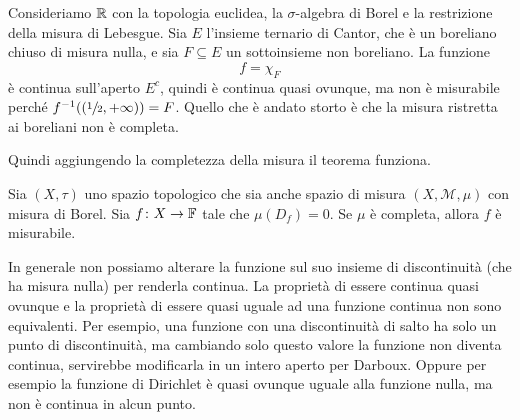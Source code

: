 \documentclass[a4paper]{article}
\begin{document}
\begin{radioactive}
\begin{snippetexample}{}
    Consideriamo \(\mathbb{R}\) con la topologia euclidea,
    la \(\sigma\)-algebra di Borel e la restrizione della misura di Lebesgue.
    Sia \(E\) l'insieme ternario di Cantor, che è un boreliano chiuso di misura
    nulla, e sia \(F \subseteq E\) un sottoinsieme non boreliano. La funzione
    \[
        f=\chi_F
    \]
    è continua sull'aperto \(E^c\), quindi è continua quasi ovunque, ma non è
    misurabile perché \(f^{-1}((\sfrac12,+\infty))=F\).
    Quello che è andato storto è che la misura ristretta ai boreliani non è completa.
\end{snippetexample}
\end{radioactive}

\begin{radioactive}
Quindi aggiungendo la completezza della misura il teorema funziona.
\end{radioactive}

\begin{radioactive}
\begin{snippettheorem}{}
    Sia \((X, \tau)\) uno spazio topologico che sia anche spazio di misura
    \((X, \mathcal M, \mu)\) con misura di Borel.
    Sia \(f \colon X \to \mathbb F\) tale che
    \(\mu(D_f) = 0\). Se \(\mu\) è completa, allora \(f\)
    è misurabile.
\end{snippettheorem}
\end{radioactive}

\begin{radioactive}
In generale non possiamo alterare la funzione sul suo insieme di discontinuità
(che ha misura nulla) per renderla continua.
La proprietà di essere continua quasi ovunque e la proprietà di essere quasi uguale
ad una funzione continua non sono equivalenti.
Per esempio, una funzione con una discontinuità di salto ha solo un punto
di discontinuità, ma cambiando solo questo valore la funzione non diventa continua,
servirebbe modificarla in un intero aperto per Darboux.
Oppure per esempio la funzione di Dirichlet è quasi ovunque uguale alla funzione nulla, ma non è continua in alcun punto.
\end{radioactive}
\end{document}
